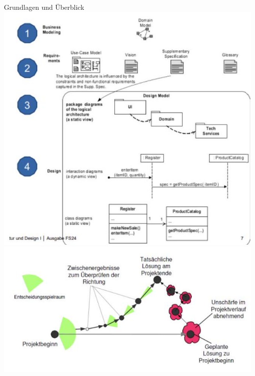 \begin{concept}{Grundlagen und Überblick}
\includegraphics[width=\linewidth]{images/2024_12_29_0d1d7b5551ea1b4b41bdg-07(2)}
\includegraphics[width=\linewidth]{images/2024_12_29_0d1d7b5551ea1b4b41bdg-08(1)}
\end{concept}

